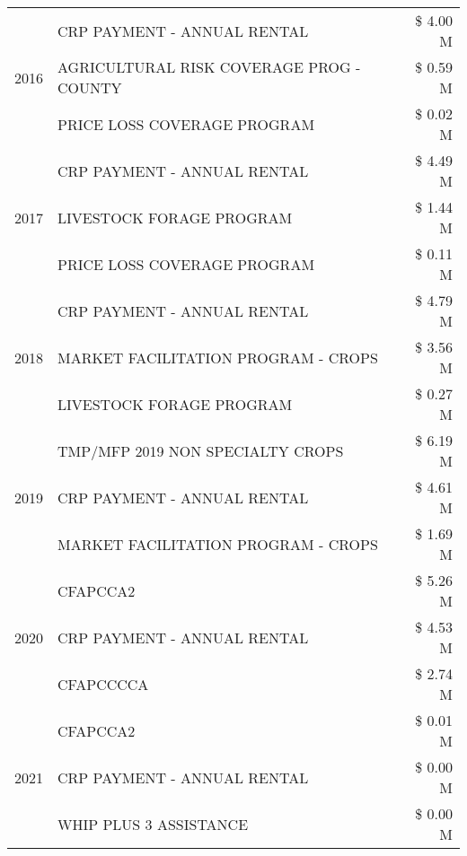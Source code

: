 \begin{tabular}{llr}
\cline{1-3}
\multirow[t]{3}{*}{2016} & CRP PAYMENT - ANNUAL RENTAL & \$ 4.00 M \\
 & AGRICULTURAL RISK COVERAGE PROG - COUNTY & \$ 0.59 M \\
 & PRICE LOSS COVERAGE PROGRAM & \$ 0.02 M \\
\cline{1-3}
\multirow[t]{3}{*}{2017} & CRP PAYMENT - ANNUAL RENTAL & \$ 4.49 M \\
 & LIVESTOCK FORAGE PROGRAM & \$ 1.44 M \\
 & PRICE LOSS COVERAGE PROGRAM & \$ 0.11 M \\
\cline{1-3}
\multirow[t]{3}{*}{2018} & CRP PAYMENT - ANNUAL RENTAL & \$ 4.79 M \\
 & MARKET FACILITATION PROGRAM - CROPS & \$ 3.56 M \\
 & LIVESTOCK FORAGE PROGRAM & \$ 0.27 M \\
\cline{1-3}
\multirow[t]{3}{*}{2019} & TMP/MFP 2019 NON SPECIALTY CROPS & \$ 6.19 M \\
 & CRP PAYMENT - ANNUAL RENTAL & \$ 4.61 M \\
 & MARKET FACILITATION PROGRAM - CROPS & \$ 1.69 M \\
\cline{1-3}
\multirow[t]{3}{*}{2020} & CFAPCCA2 & \$ 5.26 M \\
 & CRP PAYMENT - ANNUAL RENTAL & \$ 4.53 M \\
 & CFAPCCCCA & \$ 2.74 M \\
\cline{1-3}
\multirow[t]{3}{*}{2021} & CFAPCCA2 & \$ 0.01 M \\
 & CRP PAYMENT - ANNUAL RENTAL & \$ 0.00 M \\
 & WHIP PLUS 3 ASSISTANCE & \$ 0.00 M \\
\cline{1-3}
\bottomrule
\end{tabular}
